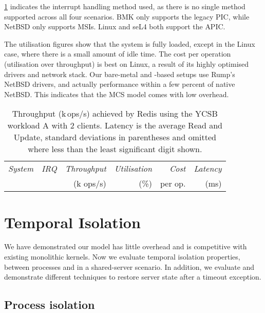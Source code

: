 \cref{t:redis} indicates the interrupt handling method used, as there is no single method supported
across all four scenarios. \gls{BMK} only supports the legacy
\gls{PIC},
while NetBSD only supports \glspl{MSI}. Linux and seL4 both support the
\gls{APIC}.

The utilisation figures show that the system is fully loaded, except
in the Linux case, where there is a small amount of idle time. The
cost per operation (utilisation over throughput) is best on Linux, a
result of its highly optimised drivers and network stack. Our
bare-metal and \selfour-based setups use Rump's NetBSD drivers, and
actually performance within a few percent of native NetBSD. This
indicates that the MCS model comes with low overhead.

\begin{table}[t]\centering
      \begin{tabularx}{\textwidth}{Xrrrrr}\toprule
          \emph{System}   & \emph{IRQ} & \emph{Throughput} & \emph{Utilisation} & \emph{Cost} & \emph{Latency} \\
                          &            & (k ops/s)         & (\%)               & per op.     & (ms)            \\
        \midrule

      
      \bottomrule
    \end{tabularx}
    \caption[Results of Redis throughput benchmark.]{Throughput (k\,ops/s) achieved by Redis using the YCSB
      workload A with 2 clients.  Latency is the average Read and Update,
      standard deviations in parentheses and omitted where less than the least
      significant digit shown.}
    \label{t:redis}
\end{table}

\section{Temporal Isolation}

We have demonstrated our model has little overhead and is competitive with existing monolithic
kernels. Now we evaluate temporal isolation properties, between processes and in a shared-server
scenario. 
In addition, we evaluate and demonstrate different
techniques to restore server state after a timeout exception.

\subsection{Process isolation} 

